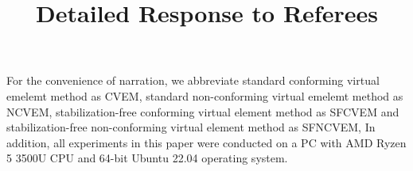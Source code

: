 \documentclass[10pt]{amsart}
\theoremstyle{definition}
\theoremstyle{remark}
\begin{document}
\title{\large Detailed Response to Referees}%

\date{}%

\maketitle

For the convenience of narration, we abbreviate standard conforming virtual emelemt
method as CVEM, standard non-conforming virtual emelemt method as NCVEM, 
stabilization-free conforming virtual element method as SFCVEM
and stabilization-free non-conforming virtual element method as SFNCVEM,
In addition, all experiments in this paper were conducted on a PC with AMD Ryzen
5 3500U CPU and 64-bit Ubuntu 22.04 operating system.
\end{document}
